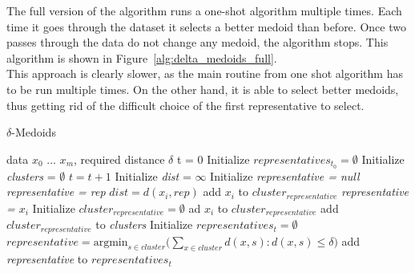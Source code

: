 \documentclass[thesis=B,english]{FITthesis}[2012/10/20]
\begin{document}
The full version of the algorithm runs a one-shot algorithm multiple times.
Each time it goes through the dataset it selects a better medoid than before.
Once two passes through the data do not change any medoid, the algorithm stops.
This algorithm is shown in Figure~\ref{alg:delta_medoids_full}.\\

This approach is clearly slower, as the main routine from one shot algorithm has to be run multiple times.
On the other hand, it is able to select better medoids, thus getting rid of the difficult choice of the first representative to select.

\begin{algorithm}
    \caption{$\delta$-Medoids}
    \label{delta_medoids_full}
    \begin{algorithmic}[1]
        \INPUT data $x_0$ ... $x_m$, required distance $\delta$
        \STATE t = 0
        \STATE Initialize $representatives_{t_0} = \emptyset$
        \STATE Initialize \textit{clusters} = $\emptyset$
        \DO
            \STATE $t = t + 1$
                \STATE Initialize \textit{dist} = $\infty$
                \STATE Initialize \textit{representative = null}
                        \STATE \textit{representative = rep}
                        \STATE $dist = d(x_i, rep)$
                    \ENDIF
                \ENDFOR
                    \STATE add $x_i$ to $cluster_{representative}$
                \ELSE
                    \STATE \textit{representative = $x_i$}
                    \STATE Initialize $cluster_{representative} = \emptyset$
                    \STATE ad $x_i$ to $cluster_{representative}$
                    \STATE add $cluster_{representative}$ to \textit{clusters}
                \ENDIF
            \ENDFOR
            \STATE Initialize $representatives_t = \emptyset$
                \STATE $representative = \textrm{argmin}_{s \in cluster} (\sum\limits_{x \in cluster}{d(x,s) : d(x,s) \le \delta)}$
                \STATE add \textit{representative} to $representatives_t$         
            \ENDFOR                                                               
    \end{algorithmic}                                                             
\end{algorithm}             
                                                                                  
\end{document}
